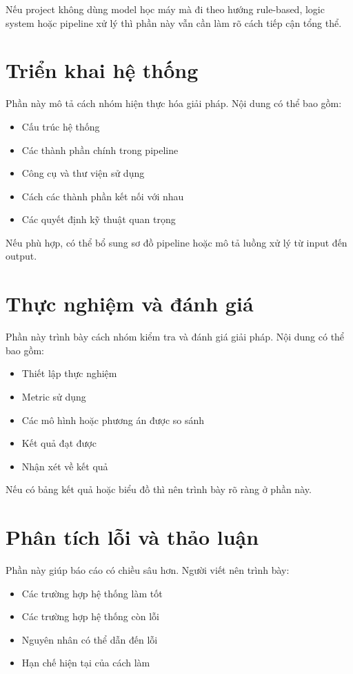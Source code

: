 \documentclass[12pt]{ai_conquer2026}
\begin{document}
Nếu project không dùng model học máy mà đi theo hướng rule-based, logic system hoặc pipeline xử lý thì phần này vẫn cần làm rõ cách tiếp cận tổng thể.

\section{Triển khai hệ thống}

Phần này mô tả cách nhóm hiện thực hóa giải pháp. Nội dung có thể bao gồm:
\begin{itemize}
    \item Cấu trúc hệ thống
    \item Các thành phần chính trong pipeline
    \item Công cụ và thư viện sử dụng
    \item Cách các thành phần kết nối với nhau
    \item Các quyết định kỹ thuật quan trọng
\end{itemize}

Nếu phù hợp, có thể bổ sung sơ đồ pipeline hoặc mô tả luồng xử lý từ input đến output.

\section{Thực nghiệm và đánh giá}

Phần này trình bày cách nhóm kiểm tra và đánh giá giải pháp. Nội dung có thể bao gồm:
\begin{itemize}
    \item Thiết lập thực nghiệm
    \item Metric sử dụng
    \item Các mô hình hoặc phương án được so sánh
    \item Kết quả đạt được
    \item Nhận xét về kết quả
\end{itemize}

Nếu có bảng kết quả hoặc biểu đồ thì nên trình bày rõ ràng ở phần này.

\section{Phân tích lỗi và thảo luận}

Phần này giúp báo cáo có chiều sâu hơn. Người viết nên trình bày:
\begin{itemize}
    \item Các trường hợp hệ thống làm tốt
    \item Các trường hợp hệ thống còn lỗi
    \item Nguyên nhân có thể dẫn đến lỗi
    \item Hạn chế hiện tại của cách làm
\end{itemize}
\end{document}
